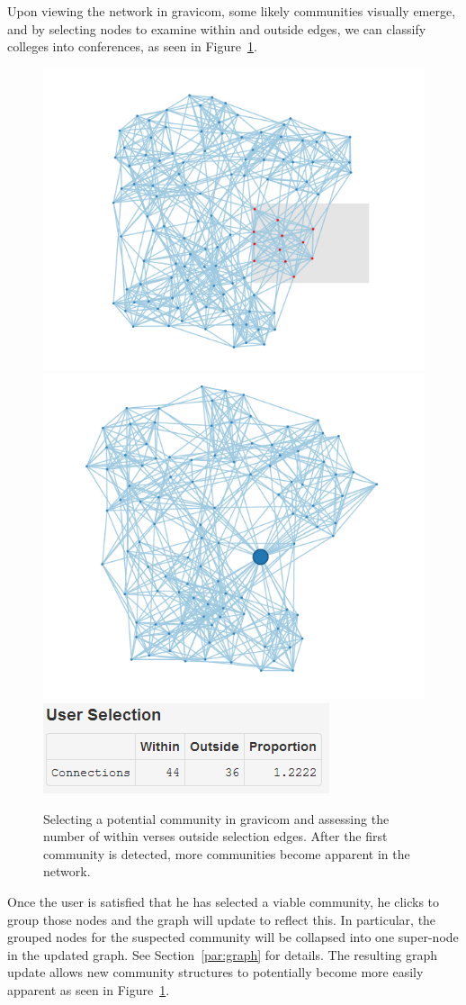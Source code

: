 \documentclass{article}\usepackage[]{graphicx}\usepackage[]{color}
\begin{document}
Upon viewing the network in gravicom, some likely communities visually emerge, and by selecting nodes to examine within and outside edges, we can classify colleges into conferences, as seen in Figure~\ref{fig:football_2}.

\begin{figure}[H]
\centering
\includegraphics[width=.49\textwidth]{images/football_2.png}
\includegraphics[width=.49\textwidth]{images/football_4.png}
\includegraphics[]{images/football_3.png}
\caption{\label{fig:football_2} Selecting a potential community in gravicom and assessing the number of within verses outside selection edges. After the first community is detected, more communities become apparent in the network.}
\end{figure}

Once the user is satisfied that he has selected a viable community, he clicks to group those nodes and the graph will update to reflect this. In particular, the grouped nodes for the suspected community will be collapsed into one super-node in the updated graph. See Section~\ref{par:graph} for details. The resulting graph update allows new community structures to potentially become more easily apparent as seen in Figure~\ref{fig:football_2}. 
\end{document}

